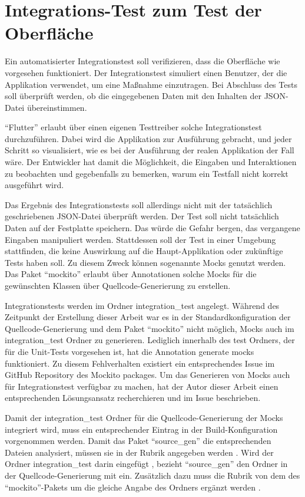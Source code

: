 \ifIncludeFigures \clearpage \fi


\section{Integrations-Test zum Test der Oberfläche}


Ein automatisierter Integrationstest soll verifizieren, dass die Oberfläche wie vorgesehen funktioniert.
Der Integrationstest simuliert einen Benutzer, der die Applikation verwendet, um eine Maßnahme einzutragen.
Bei Abschluss des Tests soll überprüft werden, ob die  eingegebenen Daten mit den Inhalten der JSON-Datei übereinstimmen.

\enquote{Flutter} erlaubt über einen eigenen Testtreiber solche Integrationstest durchzuführen.
Dabei wird die Applikation zur Ausführung gebracht, und jeder Schritt so visualisiert, wie es bei der Ausführung der realen Applikation der Fall wäre.
Der Entwickler hat damit die Möglichkeit, die Eingaben und Interaktionen zu beobachten und gegebenfalls zu bemerken, warum ein Testfall nicht korrekt ausgeführt wird.

Das Ergebnis des Integrationstests soll allerdings nicht mit der tatsächlich geschriebenen JSON-Datei überprüft werden.
Der Test soll nicht tatsächlich Daten auf der Festplatte speichern.
Das würde die Gefahr bergen, das  vergangene Eingaben manipuliert werden.
Stattdessen soll der Test in einer Umgebung stattfinden, die keine Auswirkung auf die Haupt-Applikation oder zukünftige Tests haben soll.
Zu diesem Zweck können sogenannte Mocks genutzt werden.
Das Paket \enquote{mockito} erlaubt über Annotationen solche Mocks für die gewünschten Klassen  über Quellcode-Generierung zu erstellen.

Integrationstests werden im Ordner integration_test angelegt.
Während des Zeitpunkt der Erstellung dieser Arbeit war es in der Standardkonfiguration der Quellcode-Generierung und dem Paket \enquote{mockito} nicht möglich, Mocks auch im integration_test Ordner zu generieren.  Lediglich innerhalb des test Ordners, der für die Unit-Tests vorgesehen ist, hat die Annotation generate mocks funktioniert. Zu diesem Fehlverhalten existiert ein entsprechendes Issue im GitHub Repository  des Mockito packages.  Um das Generieren von Mocks auch für Integrationstest verfügbar zu machen, hat der Autor dieser Arbeit einen entsprechenden Lösungsansatz recherchieren und im Issue beschrieben.  

Damit der integration_test Ordner für die Quellcode-Generierung der Mocks integriert wird, muss ein entsprechender Eintrag in der Build-Konfiguration vorgenommen werden.
Damit das Paket \enquote{source_gen} die entsprechenden Dateien analysiert, müssen sie in der Rubrik  angegeben werden .
Wird der Ordner integration_test darin eingefügt , bezieht \enquote{source_gen} den Ordner in der Quellcode-Generierung mit ein.
Zusätzlich dazu muss die Rubrik  von dem  des \enquote{mockito}-Pakets  um die gleiche Angabe des Ordners ergänzt werden .

